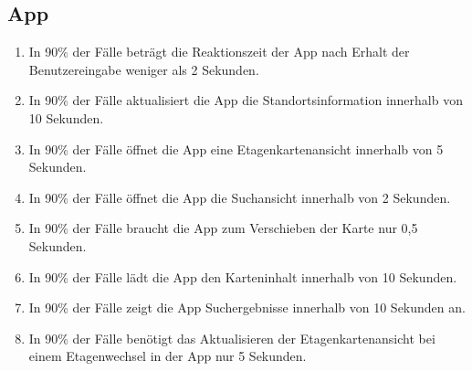 \subsection*{App}

\begin{samepage}
    \begin{enumerate}[label=\textbf{/NFL\arabic*0/}, align=left]
        \item In 90\% der Fälle beträgt die \Gls{Reaktionszeit} der App nach Erhalt der \Gls{Benutzereingabe} weniger als 2 Sekunden.
        \item In 90\% der Fälle aktualisiert die App die Standortsinformation innerhalb von 10 Sekunden.
        \item In 90\% der Fälle öffnet die App eine \Gls{Etagenkartenansicht} innerhalb von 5 Sekunden.
        \item In 90\% der Fälle öffnet die App die \Gls{Suchansicht} innerhalb von 2 Sekunden.
        \item In 90\% der Fälle braucht die App zum Verschieben der \Gls{Karte} nur 0,5 Sekunden.
        \item In 90\% der Fälle lädt die App den Karteninhalt innerhalb von 10 Sekunden.
        \item In 90\% der Fälle zeigt die App Suchergebnisse innerhalb von 10 Sekunden an.
        \item In 90\% der Fälle benötigt das Aktualisieren der \Gls{Etagenkartenansicht} bei einem \Gls{Etagenwechsel} in der App nur 5 Sekunden.
    \end{enumerate}
\end{samepage}